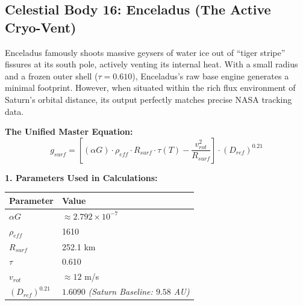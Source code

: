 \documentclass[11pt, a4paper]{article}
\begin{document}
\clearpage
\subsection{Celestial Body 16: Enceladus (The Active Cryo-Vent)} 
  Enceladus famously shoots massive geysers of water ice out of ``tiger stripe'' fissures at its south pole, actively venting its internal heat. With a small radius and a frozen outer shell ($\tau = 0.610$), Enceladus's raw base engine generates a minimal footprint. However, when situated within the rich flux environment of Saturn's orbital distance, its output perfectly matches precise NASA tracking data.

  \vspace{0.5em}
  \noindent \textbf{The Unified Master Equation:}
  $$ g_{surf} = \left[ (\alpha G) \cdot \rho_{eff} \cdot R_{surf} \cdot \tau(T) - \frac{v_{rot}^2}{R_{surf}} \right] \cdot (D_{ref})^{0.21} $$

  \vspace{0.5em}
  \noindent \textbf{1. Parameters Used in Calculations:} \\[0.5em]
  \begingroup
  \renewcommand{\arraystretch}{1.3}
  \hspace*{2em}
  \begin{tabular}{|l|l|}
    \hline
    \textbf{Parameter} & \textbf{Value} \\ \hline
    $\alpha G$ & $\approx 2.792 \times 10^{-7}$ \\ \hline
    $\rho_{eff}$ & 1610 \\ \hline
    $R_{surf}$ & 252.1 km \\ \hline
    $\tau$ & 0.610 \\ \hline
    $v_{rot}$ & $\approx 12$ m/s \\ \hline
    $(D_{ref})^{0.21}$ & $1.6090$ \textit{(Saturn Baseline: $9.58$ AU)} \\ \hline
  \end{tabular}
  \endgroup
\end{document}
